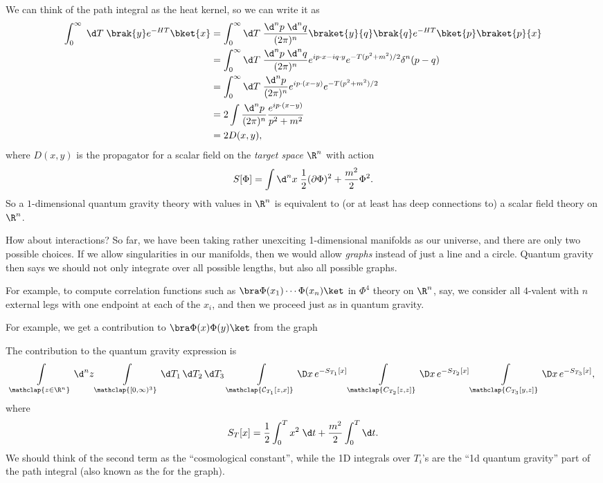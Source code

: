 \documentclass[a4paper]{article}
\begin{document}
We can think of the path integral as the heat kernel, so we can write it as
\begin{align*}
  \int_0^\infty\; \d T\; \brak{y} e^{-HT} \bket{x} &= \int_0^\infty \d T\; \frac{\d^n p\; \d^n q}{ (2\pi)^n} \braket{y}{q} \brak{q} e^{-HT}\bket{p} \braket{p}{x}\\
  &= \int_0^\infty \d T\; \frac{\d^n p\; \d ^n q}{(2\pi)^n} e^{ip\cdot x - i q \cdot y} e^{-T(p^2 + m^2)/2} \delta^n(p - q)\\
  &= \int_0^\infty \d T\; \frac{\d^n p}{(2\pi)^n} e^{ip\cdot (x - y)} e^{-T(p^2 + m^2)/2}\\
  &= 2 \int \frac{\d^n p}{(2\pi)^n} \frac{e^{ip\cdot (x - y)}}{p^2 + m^2}\\
  &= 2 D(x, y),
\end{align*}
where $D(x, y)$ is the propagator for a scalar field on the \emph{target space} $\R^n$ with action
\[
  S[\Phi] = \int \d^n x \; \frac{1}{2} (\partial \Phi)^2 + \frac{m^2}{2} \Phi^2.
\]
So a $1$-dimensional quantum gravity theory with values in $\R^n$ is equivalent to (or at least has deep connections to) a scalar field theory on $\R^n$.

How about interactions? So far, we have been taking rather unexciting 1-dimensional manifolds as our universe, and there are only two possible choices. If we allow singularities in our manifolds, then we would allow \emph{graphs} instead of just a line and a circle. Quantum gravity then says we should not only integrate over all possible lengths, but also all possible graphs.

For example, to compute correlation functions such as $\bra \Phi(x_1) \cdots \Phi(x_n)\ket$ in $\Phi^4$ theory on $\R^n$, say, we consider all $4$-valent with $n$ external legs with one endpoint at each of the $x_i$, and then we proceed just as in quantum gravity.

For example, we get a contribution to $\bra \Phi(x) \Phi(y)\ket$ from the graph
\begin{center}
\end{center}
The contribution to the quantum gravity expression is
\[
  \int\limits_{\mathclap{z \in \R^n}}\d^n z \int\limits_{\mathclap{[0, \infty)^3}} \d T_1\, \d T_2\, \d T_3\, \int\limits_{\mathclap{\mathcal{C}_{T_1}[z, x]}} \D x\, e^{-S_{T_1}[x]} \int\limits_{\mathclap{C_{T_2}[z, z]}} \D x\, e^{-S_{T_2}[x]} \int\limits_{\mathclap{C_{T_3}[y, z]}} \D x\, e^{-S_{T_3}[x]},
\]
where
\[
  S_T[x] = \frac{1}{2} \int_0^T x^2 \;\d t + \frac{m^2}{2}\int_0^T \d t.
\]
We should think of the second term as the ``cosmological constant'', while the 1D integrals over $T_i$'s are the ``1d quantum gravity'' part of the path integral (also known as the  for the graph).
\end{document}
